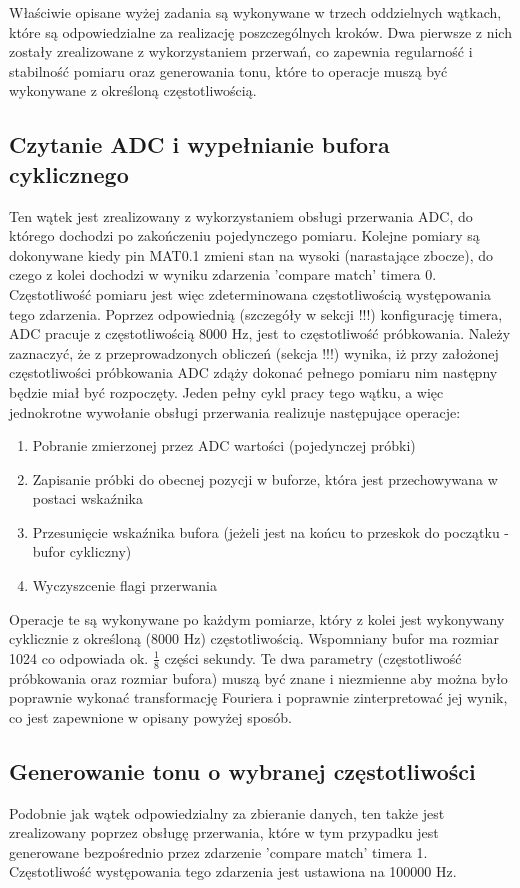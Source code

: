 \documentclass{article}
\begin{document}
Właściwie opisane wyżej zadania są wykonywane w trzech oddzielnych wątkach, które są odpowiedzialne za realizację poszczególnych kroków. Dwa pierwsze z nich zostały zrealizowane z wykorzystaniem przerwań, co zapewnia regularność i stabilność pomiaru oraz generowania tonu, które to operacje muszą być wykonywane z określoną częstotliwością.

\subsection{Czytanie ADC i wypełnianie bufora cyklicznego}
Ten wątek jest zrealizowany z wykorzystaniem obsługi przerwania ADC, do którego dochodzi po zakończeniu pojedynczego pomiaru. Kolejne pomiary są dokonywane kiedy pin MAT0.1 zmieni stan na wysoki (narastające zbocze), do czego z kolei dochodzi w wyniku zdarzenia 'compare match' timera 0. Częstotliwość pomiaru jest więc zdeterminowana częstotliwością występowania tego zdarzenia. Poprzez odpowiednią (szczegóły w sekcji !!!) konfigurację timera, ADC pracuje z częstotliwością 8000 Hz, jest to częstotliwość próbkowania. Należy zaznaczyć, że z przeprowadzonych obliczeń (sekcja !!!) wynika, iż przy założonej częstotliwości próbkowania ADC zdąży dokonać pełnego pomiaru nim następny będzie miał być rozpoczęty. Jeden pełny cykl pracy tego wątku, a więc jednokrotne wywołanie obsługi przerwania realizuje następujące operacje:
\begin{enumerate}
    \item Pobranie zmierzonej przez ADC wartości (pojedynczej próbki)
    \item Zapisanie próbki do obecnej pozycji w buforze, która jest przechowywana w postaci wskaźnika
    \item Przesunięcie wskaźnika bufora (jeżeli jest na końcu to przeskok do początku - bufor cykliczny)
    \item Wyczyszcenie flagi przerwania
\end{enumerate}
Operacje te są wykonywane po każdym pomiarze, który z kolei jest wykonywany cyklicznie z określoną (8000 Hz) częstotliwością. Wspomniany bufor ma rozmiar 1024 co odpowiada ok. $\frac{1}{8}$ części sekundy. Te dwa parametry (częstotliwość próbkowania oraz rozmiar bufora) muszą być znane i niezmienne aby można było poprawnie wykonać transformację Fouriera i poprawnie zinterpretować jej wynik, co jest zapewnione w opisany powyżej sposób.

\subsection{Generowanie tonu o wybranej częstotliwości}
Podobnie jak wątek odpowiedzialny za zbieranie danych, ten także jest zrealizowany poprzez obsługę przerwania, które w tym przypadku jest generowane bezpośrednio przez zdarzenie 'compare match' timera 1. Częstotliwość występowania tego zdarzenia jest ustawiona na 100000 Hz.
\end{document}
